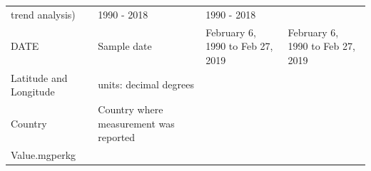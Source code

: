 \documentclass[
  12pt,
]{article}
\begin{document}
\begin{longtable}[]{@{}llll@{}}
\begin{minipage}[t]{0.22\columnwidth}
trend analysis)\strut
\end{minipage} & \begin{minipage}[t]{0.25\columnwidth}\raggedright
1990 - 2018\strut
\end{minipage} & \begin{minipage}[t]{0.25\columnwidth}\raggedright
1990 - 2018\strut
\end{minipage}\tabularnewline
\begin{minipage}[t]{0.15\columnwidth}\raggedright
DATE\strut
\end{minipage} & \begin{minipage}[t]{0.22\columnwidth}\raggedright
Sample date\strut
\end{minipage} & \begin{minipage}[t]{0.25\columnwidth}\raggedright
February 6, 1990 to Feb 27, 2019\strut
\end{minipage} & \begin{minipage}[t]{0.25\columnwidth}\raggedright
February 6, 1990 to Feb 27, 2019\strut
\end{minipage}\tabularnewline
\begin{minipage}[t]{0.15\columnwidth}\raggedright
Latitude and Longitude\strut
\end{minipage} & \begin{minipage}[t]{0.22\columnwidth}\raggedright
units: decimal degrees\strut
\end{minipage} & \begin{minipage}[t]{0.25\columnwidth}\raggedright
\strut
\end{minipage} & \begin{minipage}[t]{0.25\columnwidth}\raggedright
\strut
\end{minipage}\tabularnewline
\begin{minipage}[t]{0.15\columnwidth}\raggedright
Country\strut
\end{minipage} & \begin{minipage}[t]{0.22\columnwidth}\raggedright
Country where measurement was reported\strut
\end{minipage} & \begin{minipage}[t]{0.25\columnwidth}\raggedright
\strut
\end{minipage} & \begin{minipage}[t]{0.25\columnwidth}\raggedright
\strut
\end{minipage}\tabularnewline
\begin{minipage}[t]{0.15\columnwidth}\raggedright
Value.mgperkg\strut
\end{minipage} & \begin{minipage}[t]{0.22\columnwidth}\raggedright

\end{minipage}
\end{longtable}
\end{document}
